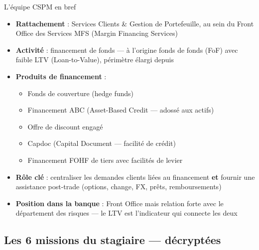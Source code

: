 \documentclass[11pt,a4paper]{article}
\begin{document}
\begin{graybox}{L'\'equipe CSPM en bref}
\begin{itemize}[nosep, leftmargin=12pt]
\item \textbf{Rattachement} : Services Clients \& Gestion de Portefeuille, au sein du
      Front Office des Services MFS (Margin Financing Services)
\item \textbf{Activit\'e} : financement de fonds --- \`a l'origine fonds de fonds (FoF) avec
      faible LTV (Loan-to-Value), p\'erim\`etre \'elargi depuis
\item \textbf{Produits de financement} :
  \begin{itemize}[nosep, leftmargin=12pt]
    \item Fonds de couverture (hedge funds)
    \item Financement ABC (Asset-Based Credit --- adoss\'e aux actifs)
    \item Offre de discount engag\'e
    \item Capdoc (Capital Document --- facilit\'e de cr\'edit)
    \item Financement FOHF de tiers avec facilit\'es de levier
  \end{itemize}
\item \textbf{R\^ole cl\'e} : centraliser les demandes clients li\'ees au financement
      \textbf{et} fournir une assistance post-trade (options, change, FX, pr\^ets, remboursements)
\item \textbf{Position dans la banque} : Front Office mais relation forte avec le d\'epartement
      des risques --- le LTV est l'indicateur qui connecte les deux
\end{itemize}
\end{graybox}

\subsection{Les 6 missions du stagiaire --- d\'ecrypt\'ees}
\end{document}
